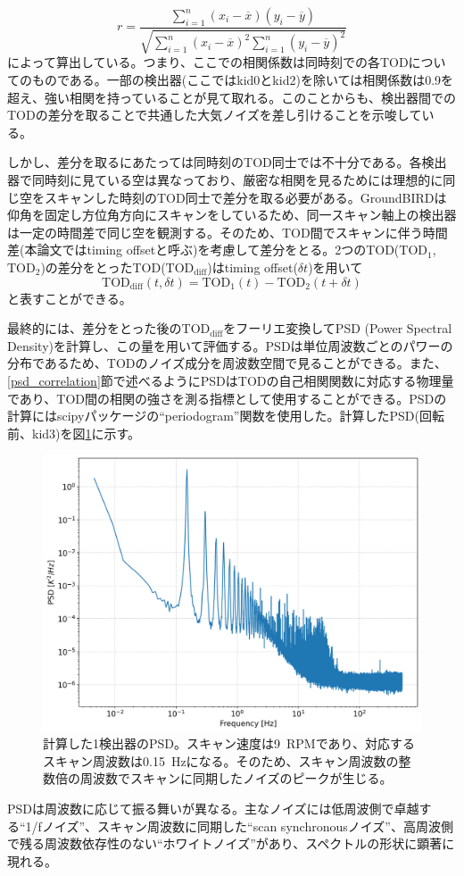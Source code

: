 \begin{equation}
  r = \frac{\displaystyle\sum_{i=1}^{n}(x_{i}-\overline{x})(y_{i}-\overline{y})}{\sqrt{\displaystyle\sum_{i=1}^{n}(x_{i}-\overline{x})^{2}\displaystyle\sum_{i=1}^{n}(y_{i}-\overline{y})^{2}}}
\end{equation}
によって算出している。つまり、ここでの相関係数は同時刻での各TODについてのものである。一部の検出器(ここではkid0とkid2)を除いては相関係数は0.9を超え、強い相関を持っていることが見て取れる。このことからも、検出器間でのTODの差分を取ることで共通した大気ノイズを差し引けることを示唆している。

しかし、差分を取るにあたっては同時刻のTOD同士では不十分である。各検出器で同時刻に見ている空は異なっており、厳密な相関を見るためには理想的に同じ空をスキャンした時刻のTOD同士で差分を取る必要がある。GroundBIRDは仰角を固定し方位角方向にスキャンをしているため、同一スキャン軸上の検出器は一定の時間差で同じ空を観測する。そのため、TOD間でスキャンに伴う時間差(本論文ではtiming offsetと呼ぶ)を考慮して差分をとる。2つのTOD($\mathrm{TOD}_{1}$, $\mathrm{TOD}_{2}$)の差分をとったTOD($\mathrm{TOD}_{\mathrm{diff}}$)はtiming offset($\delta t$)を用いて
\begin{equation}
  \mathrm{TOD}_{\mathrm{diff}}(t,\delta t) = \mathrm{TOD}_{1}(t) - \mathrm{TOD}_{2}(t + \delta t) \label{eq:tod_diff}
\end{equation}
と表すことができる\cite{sueno_doctor}。

最終的には、差分をとった後の$\mathrm{TOD}_{\mathrm{diff}}$をフーリエ変換してPSD (Power Spectral Density)を計算し、この量を用いて評価する。PSDは単位周波数ごとのパワーの分布であるため、TODのノイズ成分を周波数空間で見ることができる。また、\ref{psd_correlation}節で述べるようにPSDはTODの自己相関関数に対応する物理量であり、TOD間の相関の強さを測る指標として使用することができる。PSDの計算にはscipyパッケージの``periodogram\cite{periodogram}''関数を使用した。計算したPSD(回転前、kid3)を図\ref{9011_psd_kid3}に示す。
\begin{figure}[htbp]
  \centering
  \includegraphics[width=0.7\columnwidth]{5_alignment/figs/9011_kid3_psd.png}
  \caption{計算した1検出器のPSD。スキャン速度は\SI{9}{RPM}であり、対応するスキャン周波数は\SI{0.15}{Hz}になる。そのため、スキャン周波数の整数倍の周波数でスキャンに同期したノイズのピークが生じる。}
  \label{9011_psd_kid3}
\end{figure}
PSDは周波数に応じて振る舞いが異なる。主なノイズには低周波側で卓越する``1/fノイズ''、スキャン周波数に同期した``scan synchronousノイズ''、高周波側で残る周波数依存性のない``ホワイトノイズ''があり、スペクトルの形状に顕著に現れる。

